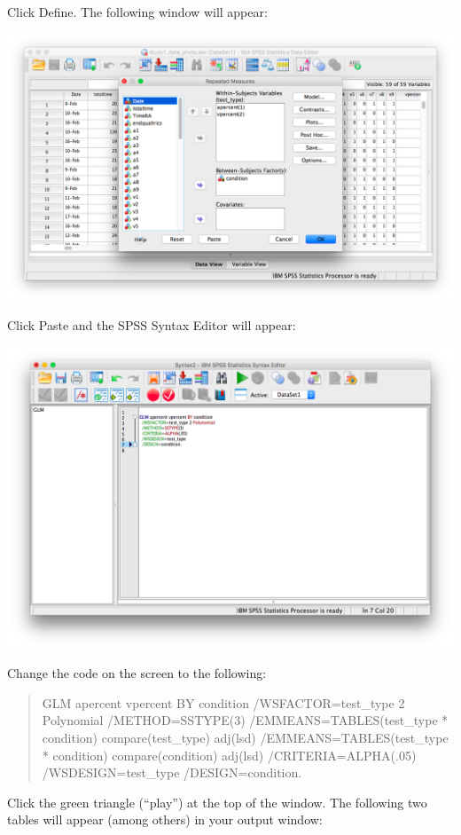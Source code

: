 \documentclass[
]{book}
\begin{document}
Click {Define}. The following window will appear:

\includegraphics{img/11.4.22.png}

Click {Paste} and the SPSS Syntax Editor will appear:

\includegraphics{img/11.4.23.png}

Change the code on the screen to the following:

\begin{quote}
GLM apercent vpercent BY condition
/WSFACTOR=test\_type 2 Polynomial
/METHOD=SSTYPE(3)
/EMMEANS=TABLES(test\_type * condition) compare(test\_type) adj(lsd)
/EMMEANS=TABLES(test\_type * condition) compare(condition) adj(lsd)
/CRITERIA=ALPHA(.05)
/WSDESIGN=test\_type
/DESIGN=condition.
\end{quote}

Click the green triangle ({``play''}) at the top of the window. The following two tables will appear (among others) in your output window:
\end{document}
